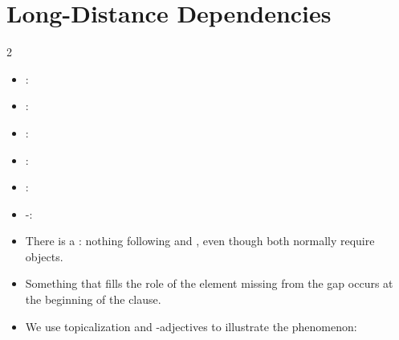 \documentclass[a4paper,landscape,headrule,footrule]{foils}
\begin{document}
\section[Long-distance dependencies: some examples, and what is new and different about them]{Long-Distance Dependencies}


\begin{multicols}{2}
\begin{itemize}
\item {}:
  \begin{exe}
    \ex {}  
    \ex {}
  \end{exe}
\item {}:
  \begin{exe}
    \ex {} 
    \ex {}
  \end{exe}
\item  {}:
  \begin{exe}
    \ex {}
    \ex {}
  \end{exe}
\item {}:
  \begin{exe}
    \ex {}
    \ex {}
  \end{exe}
\item  {}:
  \begin{exe}
    \ex {}
    \ex {}
  \end{exe}
\item  {}-:
  \begin{exe}
    \ex {}
    \ex {}
  \end{exe}
\end{itemize}
\end{multicols}

\begin{itemize}
\item There is a : nothing following  and ,
even though both normally require objects.
\item Something that fills the role of the element
missing from the gap occurs at the beginning of
the clause.
\item We use topicalization and -adjectives to
illustrate the phenomenon:
\begin{exe}
  \ex {}
  \ex {}
\end{exe}
\end{itemize}
\end{document}
